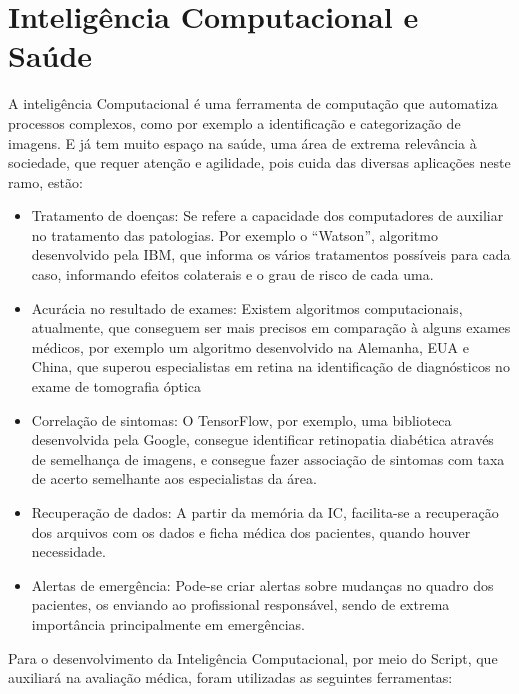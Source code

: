 \chapter{Inteligência Computacional e Saúde}
\label{chapter:inteligencia_computacional_e_saude}

A inteligência Computacional é uma ferramenta de computação que automatiza processos complexos,
como por exemplo a identificação e categorização de imagens. E já tem muito espaço na saúde,
uma área de extrema relevância à sociedade, que requer atenção e agilidade, pois cuida das diversas aplicações neste ramo, estão:

\begin{itemize}
\item Tratamento de doenças: Se refere a capacidade dos computadores de auxiliar no tratamento das patologias.
  Por exemplo o “Watson”, algoritmo desenvolvido pela IBM,
    que informa os vários tratamentos possíveis para cada caso, informando efeitos colaterais e o grau de risco de cada uma.

\item Acurácia no resultado de exames: Existem algoritmos computacionais,
  atualmente, que conseguem ser mais precisos em comparação à alguns exames médicos,
    por exemplo um algoritmo desenvolvido na Alemanha, EUA e China,
    que superou especialistas em retina na identificação de diagnósticos no exame de tomografia óptica

\item Correlação de sintomas: O TensorFlow, por exemplo,
  uma biblioteca desenvolvida pela Google, consegue identificar retinopatia diabética através de semelhança de imagens,
    e consegue fazer associação de sintomas com taxa de acerto semelhante aos especialistas da área.

\item Recuperação de dados: A partir da memória da IC,
  facilita-se a recuperação dos arquivos com os dados e ficha médica dos pacientes, quando houver necessidade.

\item Alertas de emergência: Pode-se criar alertas sobre mudanças no quadro dos pacientes,
  os enviando ao profissional responsável, sendo de extrema importância principalmente em emergências.
\end{itemize}

Para o desenvolvimento da Inteligência Computacional, por meio do Script, que auxiliará na avaliação médica,
foram utilizadas as seguintes ferramentas:

